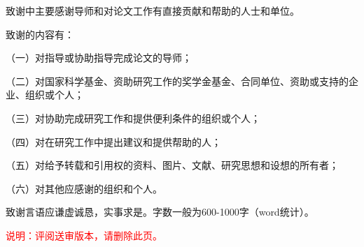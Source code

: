 
\begin{thanks*}
致谢中主要感谢导师和对论文工作有直接贡献和帮助的人士和单位。

致谢的内容有：

（一）对指导或协助指导完成论文的导师；

（二）对国家科学基金、资助研究工作的奖学金基金、合同单位、资助或支持的企业、组织或个人；

（三）对协助完成研究工作和提供便利条件的组织或个人；

（四）对在研究工作中提出建议和提供帮助的人；

（五）对给予转载和引用权的资料、图片、文献、研究思想和设想的所有者；

（六）对其他应感谢的组织和个人。

致谢言语应谦虚诚恳，实事求是。字数一般为600-1000字（word统计）。

\textcolor{red}{
    说明：评阅送审版本，请删除此页。
}
\end{thanks*}